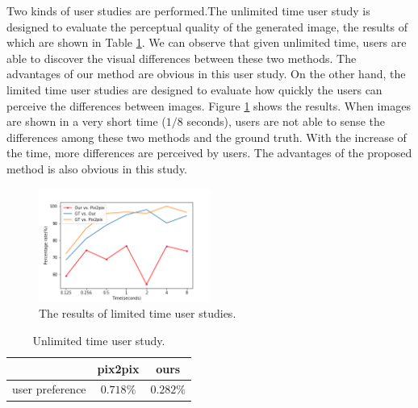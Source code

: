 Two kinds of user studies are performed.The unlimited time user study is designed to evaluate the perceptual quality of the generated image, the results of which are shown in Table \ref{table:unlimited_time}. We can observe that given unlimited time, users are able to discover the visual differences between these two methods. The advantages of our method are obvious in this user study. On the other hand, the limited time user studies are designed to evaluate how quickly the users can perceive the differences between images. Figure \ref{fig:limited_time} shows the results. When images are shown in a very short time ($1/8$ seconds), users are not able to sense the differences among these two methods and the ground truth. With the increase of the time, more differences are perceived by users. The advantages of the proposed method is also obvious in this study.
%
\begin{figure}
	\includegraphics[width=0.5\textwidth]{figures/limited_time}
	\caption{The results of limited time user studies. }
	\label{fig:limited_time}
\end{figure}
%
%
\begin{table}[h]
	\centering	
	\caption{Unlimited time user study.}
	\begin{tabular}{|l|c|c|}\hline
		 & pix2pix & ours \\\hline
		user preference&$0.718\%$&$0.282\%$\\\hline
	\end{tabular}
	\label{table:unlimited_time}
\end{table}


